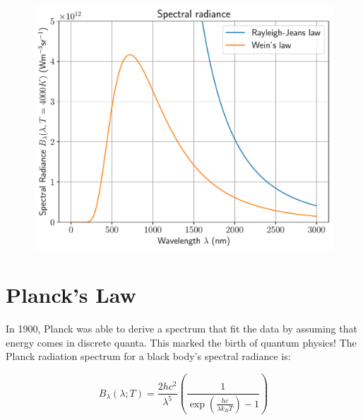 \documentclass[
  letterpaper,
  DIV=11,
  numbers=noendperiod]{scrreprt}
\begin{document}
\begin{figure}[H]

{\centering \includegraphics{SP1.1_-_Stellar_Properties_files/figure-pdf/cell-19-output-1.pdf}

}

\end{figure}

\hypertarget{plancks-law}{%
\section{Planck's Law}\label{plancks-law}}

In 1900, Planck was able to derive a spectrum that fit the data by
assuming that energy comes in discrete quanta. This marked the birth of
quantum physics! The Planck radiation spectrum for a black body's
spectral radiance is:

\begin{equation}
B_\lambda(\lambda; T) = \frac{2 hc^2}{\lambda^5}\left(\frac{1}{\exp\left(\frac{hc}{\lambda k_B T}\right) -1} \right)
\end{equation}
\end{document}
